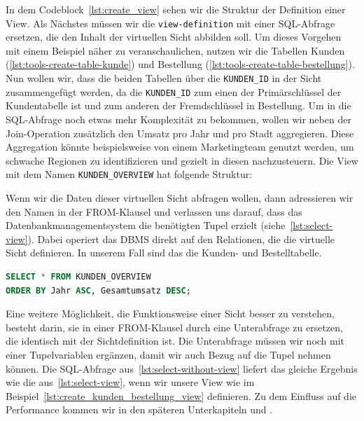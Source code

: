 In dem Codeblock~\ref{lst:create_view} sehen wir die Struktur der Definition einer View.
Als Nächstes müssen wir die \texttt{view-definition} mit einer SQL-Abfrage ersetzen, die den Inhalt der virtuellen Sicht abbilden soll.
Um dieses Vorgehen mit einem Beispiel näher zu veranschaulichen, nutzen wir die Tabellen Kunden (\ref{lst:tools-create-table-kunde}) und Bestellung (\ref{lst:tools-create-table-bestellung}).
Nun wollen wir, dass die beiden Tabellen über die \texttt{KUNDEN\_ID} in der Sicht zusammengefügt werden, da die \texttt{KUNDEN\_ID} zum einen der Primärschlüssel der Kundentabelle ist und zum anderen der Fremdschlüssel in Bestellung.
Um in die SQL-Abfrage noch etwas mehr Komplexität zu bekommen, wollen wir neben der Join-Operation zusätzlich den Umsatz pro Jahr und pro Stadt aggregieren.
Diese Aggregation könnte beispielsweise von einem Marketingteam genutzt werden, um schwache Regionen zu identifizieren und gezielt in diesen nachzusteuern.
Die View mit dem Namen \texttt{KUNDEN\_OVERVIEW} hat folgende Struktur:

\vspace{-5pt}


Wenn wir die Daten dieser virtuellen Sicht abfragen wollen, dann adressieren wir den Namen in der FROM-Klausel und verlassen uns darauf, dass das Datenbankmanagementsystem die benötigten Tupel erzielt (siehe~\ref{lst:select-view}).
Dabei operiert das DBMS direkt auf den Relationen, die die virtuelle Sicht definieren.
In unserem Fall sind das die Kunden- und Bestelltabelle.

\vspace{-5pt}
\begin{lstlisting}[language=SQL,caption=SQL-Befehl mit Sicht,label={lst:select-view}]
SELECT * FROM KUNDEN_OVERVIEW
ORDER BY Jahr ASC, Gesamtumsatz DESC;
\end{lstlisting}
\vspace{-5pt}

Eine weitere Möglichkeit, die Funktionsweise einer Sicht besser zu verstehen, besteht darin, sie in einer FROM-Klausel durch eine Unterabfrage zu ersetzen, die identisch mit der Sichtdefinition ist.
Die Unterabfrage müssen wir noch mit einer Tupelvariablen ergänzen, damit wir auch Bezug auf die Tupel nehmen können.
Die SQL-Abfrage aus~\ref{lst:select-without-view} liefert das gleiche Ergebnis wie die aus~\ref{lst:select-view}, wenn wir unsere View wie im Beispiel~\ref{lst:create_kunden_bestellung_view} definieren.
Zu dem Einfluss auf die Performance kommen wir in den späteren Unterkapiteln  und .

